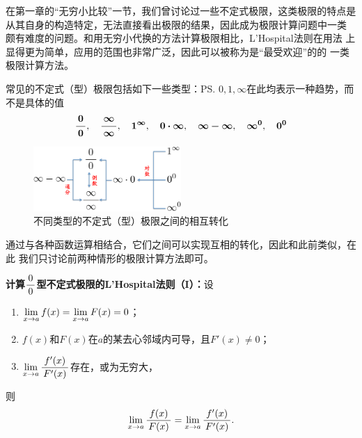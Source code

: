 在第一章的“无穷小比较”一节，我们曾讨论过一些不定式极限，这类极限的特点是
从其自身的构造特定，无法直接看出极限的结果，因此成为极限计算问题中一类
颇有难度的问题。和用无穷小代换的方法计算极限相比，L'Hospital法则在用法
上显得更为简单，应用的范围也非常广泛，因此可以被称为是“最受欢迎”的的
一类极限计算方法。

常见的不定式（型）极限包括如下一些类型：\ps{$0,1,\infty$在此均表示一种趋势，而不是具体的值}
$$\bm{\displaystyle\frac{\,{0}\,}{\,{0}\,}}, \quad \bm{\displaystyle\frac{\,{\infty}\,}{\,{\infty}\,}}, \quad
\bm{1^{\infty}}, \quad \bm{0\cdot\infty}, \quad
\bm{\infty-\infty}, \quad \bm{\infty^0}, \bm{\quad 0^0}$$

\begin{figure}[h]
	\centering
	\includegraphics[width=0.5\textwidth]
	{./Images/Ch03/lim00.pdf}
	\caption{不同类型的不定式（型）极限之间的相互转化}
	\label{fig:lim00}
\end{figure}

通过与各种函数运算相结合，它们之间可以实现互相的转化，因此和此前类似，在此
我们只讨论前两种情形的极限计算方法即可。


\bs
{}

\begin{thx}
	{\bf 计算$\displaystyle\frac{\,{0}\,}{\,{0}\,}$型不定式极限的L'Hospital法则（I）：}设
	\begin{enumerate}[(1)]
	  \item $\lim\limits_{x\to{a}}f(x)=\lim\limits_{x\to{a}}F(x)=0$；
	  \item $f(x)$和$F(x)$在$a$的某去心邻域内可导，且$F'(x)\ne0$；
	  \item $\lim\limits_{x\to{a}}\displaystyle\frac{\,{f'(x)}\,}{\,{F'(x)}\,}$存在，或为无穷大，
	\end{enumerate}
	则
	$$\lim\limits_{x\to{a}}\displaystyle\frac{\,{f(x)}\,}{\,{F(x)}\,}=\lim\limits_{x\to{a}}\displaystyle\frac{\,{f'(x)}\,}{\,{F'(x)}\,}.$$
\end{thx}

